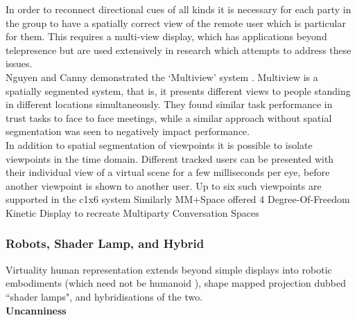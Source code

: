 In order to reconnect directional cues of all kinds it is necessary for each party in the group to have a spatially correct view of the remote user which is particular for them. This requires a multi-view display, which has applications beyond telepresence but are used extensively in research which attempts to address these issues.\\
Nguyen and Canny demonstrated the `Multiview' system \cite{Nguyen2005}. Multiview is a spatially segmented system, that is, it presents different views to people standing in different locations simultaneously. They found similar task performance in trust tasks to face to face meetings, while a similar approach without spatial segmentation was seen to negatively impact performance.\\
In addition to spatial segmentation of viewpoints it is possible to isolate viewpoints in the time domain. Different tracked users can be presented with their individual view of a virtual scene for a few milliseconds per eye, before another viewpoint is shown to another user. Up to six such viewpoints are supported in the c1x6 system \cite{Kulik2011}
Similarly MM+Space offered 4 Degree-Of-Freedom Kinetic Display to recreate Multiparty Conversation Spaces \cite{Otsuka2013}
            \subsubsection{Robots, Shader Lamp, and Hybrid}
                Virtuality human representation extends beyond simple displays into robotic embodiments (which need not be humanoid \cite{Marti2005}), shape mapped projection dubbed ``shader lamps", and hybridisations of the two.\\ 
				\textbf{Uncanniness}
				
